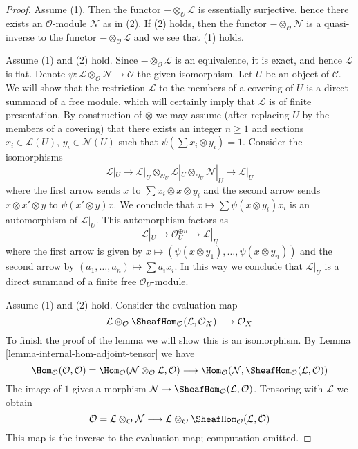 \begin{proof}
Assume (1). Then the functor $- \otimes_\mathcal{O} \mathcal{L}$
is essentially surjective, hence there exists an $\mathcal{O}$-module
$\mathcal{N}$ as in (2). If (2) holds, then the functor
$- \otimes_\mathcal{O} \mathcal{N}$ is a quasi-inverse
to the functor $- \otimes_\mathcal{O} \mathcal{L}$ and
we see that (1) holds.

\medskip\noindent
Assume (1) and (2) hold. Since $- \otimes_\mathcal{O} \mathcal{L}$ is an
equivalence, it is exact, and hence $\mathcal{L}$ is flat. Denote
$\psi : \mathcal{L} \otimes_\mathcal{O} \mathcal{N} \to \mathcal{O}$
the given isomorphism. Let $U$ be an object of $\mathcal{C}$.
We will show that the restriction $\mathcal{L}$ to the members
of a covering of $U$ is a direct summand of a free module, which will
certainly imply that $\mathcal{L}$ is of finite presentation.
By construction of $\otimes$ we may assume (after replacing
$U$ by the members of a covering) that there exists
an integer $n \geq 1$ and sections $x_i \in \mathcal{L}(U)$,
$y_i \in \mathcal{N}(U)$ such that $\psi(\sum x_i \otimes y_i) = 1$.
Consider the isomorphisms
$$
\mathcal{L}|_U \to
\mathcal{L}|_U \otimes_{\mathcal{O}_U}
\mathcal{L}|_U \otimes_{\mathcal{O}_U} \mathcal{N}|_U \to \mathcal{L}|_U
$$
where the first arrow sends $x$ to $\sum x_i \otimes x \otimes y_i$
and the second arrow sends $x \otimes x' \otimes y$ to $\psi(x' \otimes y)x$.
We conclude that $x \mapsto \sum \psi(x \otimes y_i)x_i$ is
an automorphism of $\mathcal{L}|_U$. This automorphism factors as
$$
\mathcal{L}|_U \to \mathcal{O}_U^{\oplus n} \to \mathcal{L}|_U
$$
where the first arrow is given by
$x \mapsto (\psi(x \otimes y_1), \ldots, \psi(x \otimes y_n))$
and the second arrow by $(a_1, \ldots, a_n) \mapsto \sum a_i x_i$.
In this way we conclude that $\mathcal{L}|_U$ is a direct summand
of a finite free $\mathcal{O}_U$-module.

\medskip\noindent
Assume (1) and (2) hold. Consider the evaluation map
$$
\mathcal{L} \otimes_\mathcal{O}
\SheafHom_\mathcal{O}(\mathcal{L}, \mathcal{O}_X)
\longrightarrow \mathcal{O}_X
$$
To finish the proof of the lemma we will show this is an isomorphism.
By Lemma \ref{lemma-internal-hom-adjoint-tensor} we have
$$
\Hom_\mathcal{O}(\mathcal{O}, \mathcal{O}) =
\Hom_\mathcal{O}
(\mathcal{N} \otimes_\mathcal{O} \mathcal{L}, \mathcal{O})
\longrightarrow
\Hom_\mathcal{O}
(\mathcal{N}, \SheafHom_\mathcal{O}(\mathcal{L}, \mathcal{O}))
$$
The image of $1$ gives a morphism
$\mathcal{N} \to \SheafHom_\mathcal{O}(\mathcal{L}, \mathcal{O})$.
Tensoring with $\mathcal{L}$ we obtain
$$
\mathcal{O} = \mathcal{L} \otimes_\mathcal{O} \mathcal{N}
\longrightarrow
\mathcal{L} \otimes_\mathcal{O} \SheafHom_\mathcal{O}(\mathcal{L}, \mathcal{O})
$$
This map is the inverse to the evaluation map; computation omitted.
\end{proof}

